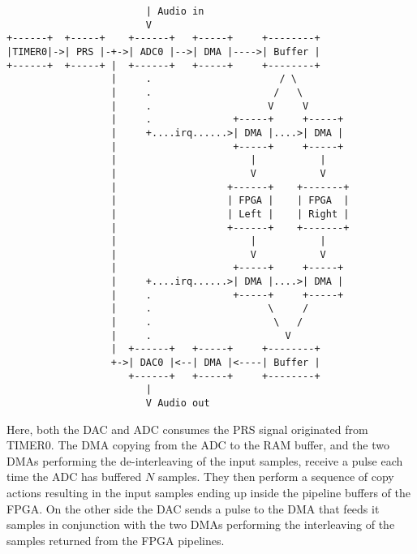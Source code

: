 \begin{verbatim}
                        | Audio in
                        V
+------+  +-----+    +------+   +-----+     +--------+
|TIMER0|->| PRS |-+->| ADC0 |-->| DMA |---->| Buffer |
+------+  +-----+ |  +------+   +-----+     +--------+
                  |     .                      / \
                  |     .                     /   \
                  |     .                    V     V
                  |     .              +-----+     +-----+
                  |     +....irq......>| DMA |....>| DMA |
                  |                    +-----+     +-----+
                  |                       |           |
                  |                       V           V
                  |                   +------+    +-------+
                  |                   | FPGA |    | FPGA  |
                  |                   | Left |    | Right |
                  |                   +------+    +-------+
                  |                       |           |
                  |                       V           V
                  |                    +-----+     +-----+
                  |     +....irq......>| DMA |....>| DMA |
                  |     .              +-----+     +-----+
                  |     .                    \     /
                  |     .                     \   /
                  |     .                       V
                  |  +------+   +-----+     +--------+
                  +->| DAC0 |<--| DMA |<----| Buffer |
                     +------+   +-----+     +--------+
                        |
                        V Audio out
\end{verbatim}

Here, both the DAC and ADC consumes the PRS signal originated from TIMER0. The
DMA copying from the ADC to the RAM buffer, and the two DMAs performing the
de-interleaving of the input samples, receive a pulse each time the ADC has
buffered $N$ samples. They then perform a sequence of copy actions resulting
in the input samples ending up inside the pipeline buffers of the FPGA. On the
other side the DAC sends a pulse to the DMA that feeds it samples in conjunction
with the two DMAs performing the interleaving of the samples returned from the
FPGA pipelines.
